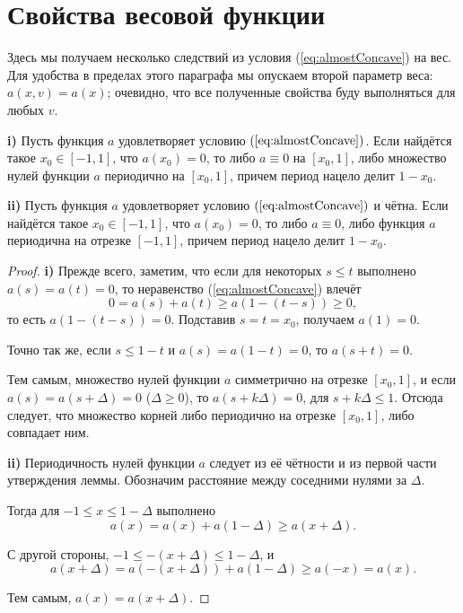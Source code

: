 \section{Свойства весовой функции}

Здесь мы получаем несколько следствий из условия (\ref{eq:almostConcave}) на вес.
Для удобства в пределах этого параграфа мы опускаем второй параметр веса: $a(x, v) = a(x)$;
очевидно, что все полученные свойства буду выполняться для любых $v$.

\begin{lm}
\label{lm:weight_periodicity}
\textbf{\textup{i)}}
Пусть функция $a$ удовлетворяет условию $(\ref{eq:almostConcave})$.
Если найдётся такое $x_0 \in [-1, 1]$, что $a(x_0) = 0$,
то либо $a \equiv 0$ на $[x_0, 1]$,
либо множество нулей функции $a$ периодично на $[x_0, 1]$, причем период нацело делит $1 - x_0$.

\textbf{\textup{ii)}}
Пусть функция $a$ удовлетворяет условию $(\ref{eq:almostConcave})$ и чётна.
Если найдётся такое $x_0 \in [-1, 1]$, что $a(x_0) = 0$,
то либо $a \equiv 0$,
либо функция $a$ периодична на отрезке $[-1, 1]$, причем период нацело делит $1 - x_0$.
\end{lm}

\begin{proof}
\textbf{\textup{i)}}
Прежде всего, заметим, что если для некоторых $s \le t$ выполнено $a(s) = a(t) = 0$,
то неравенство (\ref{eq:almostConcave}) влечёт
$$
0 = a(s) + a(t) \ge a(1 - (t - s)) \ge 0,
$$
то есть $a(1 - (t - s)) = 0$.
Подставив $s = t = x_0$, получаем $a(1) = 0$.

Точно так же, если $s \le 1 - t$ и $a(s) = a(1 - t) = 0$, то $a(s + t) = 0$.

Тем самым, множество нулей функции $a$ симметрично на отрезке $[x_0, 1]$,
и если $a(s) = a(s + \Delta) = 0$ ($\Delta \ge 0$),
то $a(s + k\Delta) = 0$, для $s + k\Delta \le 1$.
Отсюда следует, что множество корней либо периодично на отрезке $[x_0, 1]$, либо совпадает ним.

\textbf{\textup{ii)}}
Периодичность нулей функции $a$ следует из её чётности и из первой части утверждения леммы.
Обозначим расстояние между соседними нулями за $\Delta$.

Тогда для $-1 \le x \le 1 - \Delta$ выполнено
$$
a(x) = a(x) + a(1 - \Delta) \ge a(x + \Delta).
$$

С другой стороны, $-1 \le -(x + \Delta) \le 1 - \Delta$, и
$$
a(x + \Delta) = a(-(x + \Delta)) + a(1 - \Delta) \ge a(-x) = a(x).
$$

Тем самым, $a(x) = a(x + \Delta)$.
\end{proof}

